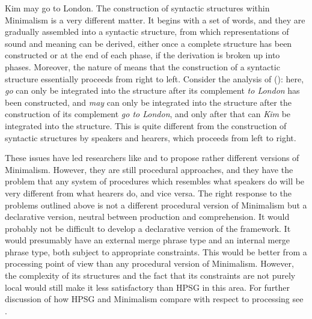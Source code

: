 \documentclass[output=paper
 	        ,biblatex
                ,babelshorthands
                ,newtxmath
                ,draftmode
                ,colorlinks, citecolor=brown
]{langscibook}
\begin{document}
\ea
Kim may go to London.
\z
The construction of syntactic structures within Minimalism is a very different matter. It begins with a set of words,
and they are gradually assembled into a syntactic structure, from which representations of sound and
meaning can be derived, either once a complete structure has been constructed or at the end of each
phase, if the derivation is broken up into phases. Moreover, the nature of  means that the
construction of a syntactic structure essentially proceeds from right to left. Consider the
analysis of (): here, \emph{go} can only be integrated into the structure after its complement \emph{to London} has been
constructed, and \emph{may} can only be integrated into the structure after the construction of its
complement \emph{go to London}, and only after that can \emph{Kim} be integrated into the
structure. This is quite different from the construction of syntactic structures by speakers and
hearers, which proceeds from left to right.

These issues have led researchers like \citet{Phillips2003a} and \citet{Chesi2015a-u} to propose rather different
versions of Minimalism. However, they are still procedural approaches, and they have the problem
that any system of procedures which resembles what speakers do will be very different from what
hearers do, and vice versa. The right response to the problems outlined above is not a different
procedural version of Minimalism but a declarative version, neutral between production and
comprehension. It would probably not be difficult to develop a declarative version of the
framework. It would presumably have an external merge phrase type and an internal merge phrase type,
both subject to appropriate constraints. This would be better from a processing point of view than
any procedural version of Minimalism. However, the complexity of its structures and the fact that
its constraints are not purely local would still make it less satisfactory than HPSG in this area.
For further discussion of how HPSG and Minimalism compare with respect to processing see .


\end{document}
